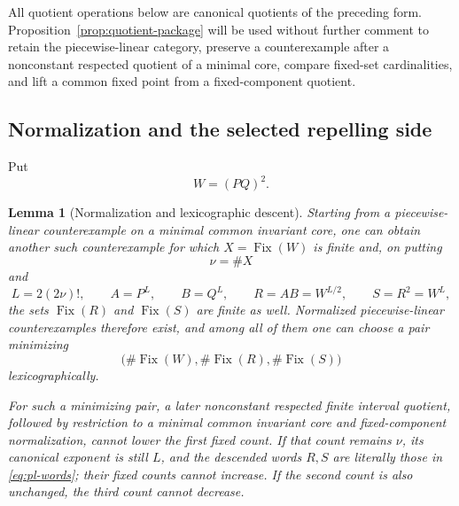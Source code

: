 \documentclass[11pt]{article}
\newtheorem{lemma}[theorem]{Lemma}
\theoremstyle{definition}
\theoremstyle{remark}
\newcommand{\Fix}{\operatorname{Fix}}
\begin{document}
All quotient operations below are canonical quotients of the preceding
form.  Proposition~\ref{prop:quotient-package} will be used without further
comment to retain the piecewise-linear category, preserve a counterexample after a
nonconstant respected quotient of a minimal core, compare fixed-set
cardinalities, and lift a common fixed point from a fixed-component quotient.

\subsection{Normalization and the selected repelling side}

Put
\begin{equation}\label{eq:pl-W}
 W=(PQ)^2.
\end{equation}

\begin{lemma}[Normalization and lexicographic descent]
\label{lem:pl-normalization}
Starting from a piecewise-linear counterexample on a minimal common
invariant core, one can obtain another such counterexample for which
\(X=\Fix(W)\) is finite and, on putting
\[
 \nu=\#X
\]
and
\begin{equation}\label{eq:pl-words}
 L=2(2\nu)!,\qquad A=P^L,\qquad B=Q^L,\qquad
 R=AB=W^{L/2},\qquad S=R^2=W^L,
\end{equation}
the sets \(\Fix(R)\) and \(\Fix(S)\) are finite as well.  Normalized piecewise-linear
counterexamples therefore exist, and among all of them one can choose a pair
minimizing
\begin{equation}\label{eq:pl-mintriple}
 \bigl(\#\Fix(W),\#\Fix(R),\#\Fix(S)\bigr)
\end{equation}
lexicographically.

For such a minimizing pair, a later nonconstant respected finite interval
quotient, followed by restriction to a minimal common invariant core and
fixed-component normalization, cannot lower the first fixed count.  If that
count remains \(\nu\), its canonical exponent is still \(L\), and the
descended words \(R,S\) are literally those in \eqref{eq:pl-words}; their
fixed counts cannot increase.  If the second count is also unchanged, the
third count cannot decrease.
\end{lemma}
\end{document}
